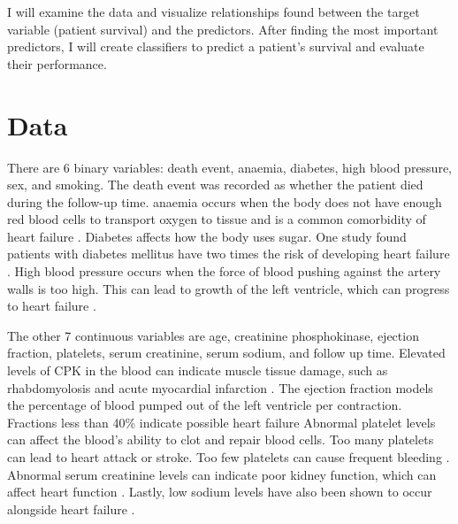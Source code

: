 \documentclass[12pt, letterpaper]{article}
\begin{document}
	I will examine the data and visualize relationships found between the target variable (patient survival) and the predictors. After finding the most important predictors, I will create classifiers to predict a patient's survival and evaluate their performance.

	\section{Data}
	
	There are 6 binary variables: death event, anaemia, diabetes, high blood pressure, sex, and smoking. The death event was recorded as whether the patient died during the follow-up time. anaemia occurs when the body does not have enough red blood cells to transport oxygen to tissue and is a common comorbidity of heart failure \cite{doi:10.1161/CIRCULATIONAHA.118.030099}. Diabetes affects how the body uses sugar. One study found patients with diabetes mellitus have two times the risk of developing heart failure \cite{doi:10.1161/CIRCRESAHA.118.311371}. High blood pressure occurs when the force of blood pushing against the artery walls is too high. This can lead to growth of the left ventricle, which can progress to heart failure \cite{hbp}.
	
	The other 7 continuous variables are age, creatinine phosphokinase, ejection fraction, platelets, serum creatinine, serum sodium, and follow up time. Elevated levels of CPK in the blood can indicate muscle tissue damage, such as rhabdomyolosis and acute myocardial infarction \cite{cpkArticle}. The ejection fraction models the percentage of blood pumped out of the left ventricle per contraction. Fractions less than 40\% indicate possible heart failure \cite{ejectionFraction} Abnormal platelet levels can affect the blood's ability to clot and repair blood cells. Too many platelets can lead to heart attack or stroke. Too few platelets can cause frequent bleeding \cite{platelets}. Abnormal serum creatinine levels can indicate poor kidney function, which can affect heart function \cite{creatinine}. Lastly, low sodium levels have also been shown to occur alongside heart failure \cite{sodium}.
	
\end{document}
